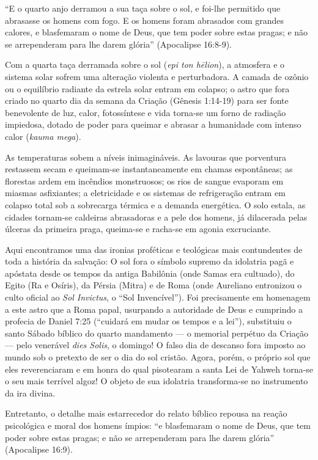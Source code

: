 \documentclass[11pt,a4paper,openany]{book}
\begin{document}
``E o quarto anjo derramou a sua taça sobre o sol, e foi-lhe permitido que abrasasse os homens com fogo. E os homens foram abrasados com grandes calores, e blasfemaram o nome de Deus, que tem poder sobre estas pragas; e não se arrependeram para lhe darem glória'' (Apocalipse 16:8-9).

Com a quarta taça derramada sobre o sol (\textit{epi ton hēlion}), a atmosfera e o sistema solar sofrem uma alteração violenta e perturbadora. A camada de ozônio ou o equilíbrio radiante da estrela solar entram em colapso; o astro que fora criado no quarto dia da semana da Criação (Gênesis 1:14-19) para ser fonte benevolente de luz, calor, fotossíntese e vida torna-se um forno de radiação impiedosa, dotado de poder para queimar e abrasar a humanidade com intenso calor (\textit{kauma mega}).

As temperaturas sobem a níveis inimagináveis. As lavouras que porventura restassem secam e queimam-se instantaneamente em chamas espontâneas; as florestas ardem em incêndios monstruosos; os rios de sangue evaporam em miasmas asfixiantes; a eletricidade e os sistemas de refrigeração entram em colapso total sob a sobrecarga térmica e a demanda energética. O solo estala, as cidades tornam-se caldeiras abrasadoras e a pele dos homens, já dilacerada pelas úlceras da primeira praga, queima-se e racha-se em agonia excruciante.

Aqui encontramos uma das ironias proféticas e teológicas mais contundentes de toda a história da salvação:
O sol fora o símbolo supremo da idolatria pagã e apóstata desde os tempos da antiga Babilônia (onde Samas era cultuado), do Egito (Ra e Osíris), da Pérsia (Mitra) e de Roma (onde Aureliano entronizou o culto oficial ao \textit{Sol Invictus}, o ``Sol Invencível'').
Foi precisamente em homenagem a este astro que a Roma papal, usurpando a autoridade de Deus e cumprindo a profecia de Daniel 7:25 (``cuidará em mudar os tempos e a lei''), substituiu o santo Sábado bíblico do quarto mandamento — o memorial perpétuo da Criação — pelo venerável \textit{dies Solis}, o domingo! O falso dia de descanso fora imposto ao mundo sob o pretexto de ser o dia do sol cristão. Agora, porém, o próprio sol que eles reverenciaram e em honra do qual pisotearam a santa Lei de Yahweh torna-se o seu mais terrível algoz! O objeto de sua idolatria transforma-se no instrumento da ira divina.

Entretanto, o detalhe mais estarrecedor do relato bíblico repousa na reação psicológica e moral dos homens ímpios:
``e blasfemaram o nome de Deus, que tem poder sobre estas pragas; e não se arrependeram para lhe darem glória'' (Apocalipse 16:9).
\end{document}
